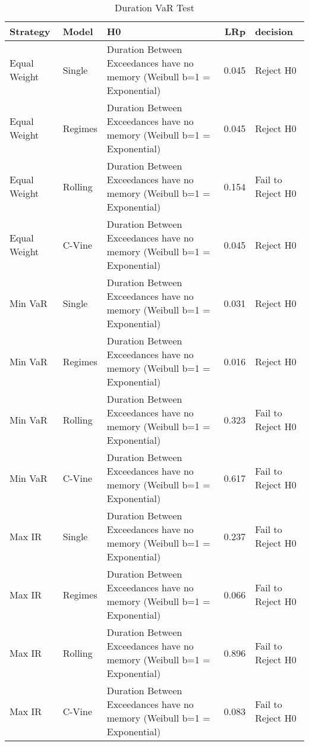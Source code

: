 \begin{table}

\caption{Duration VaR Test}
\centering
\begin{tabular}[t]{lllrl}
\toprule
Strategy & Model & H0 & LRp & decision\\
\midrule
Equal Weight & Single & Duration Between Exceedances have no memory (Weibull b=1 = Exponential) & 0.045 & Reject H0\\
Equal Weight & Regimes & Duration Between Exceedances have no memory (Weibull b=1 = Exponential) & 0.045 & Reject H0\\
Equal Weight & Rolling & Duration Between Exceedances have no memory (Weibull b=1 = Exponential) & 0.154 & Fail to Reject H0\\
Equal Weight & C-Vine & Duration Between Exceedances have no memory (Weibull b=1 = Exponential) & 0.045 & Reject H0\\
Min VaR & Single & Duration Between Exceedances have no memory (Weibull b=1 = Exponential) & 0.031 & Reject H0\\
\addlinespace
Min VaR & Regimes & Duration Between Exceedances have no memory (Weibull b=1 = Exponential) & 0.016 & Reject H0\\
Min VaR & Rolling & Duration Between Exceedances have no memory (Weibull b=1 = Exponential) & 0.323 & Fail to Reject H0\\
Min VaR & C-Vine & Duration Between Exceedances have no memory (Weibull b=1 = Exponential) & 0.617 & Fail to Reject H0\\
Max IR & Single & Duration Between Exceedances have no memory (Weibull b=1 = Exponential) & 0.237 & Fail to Reject H0\\
Max IR & Regimes & Duration Between Exceedances have no memory (Weibull b=1 = Exponential) & 0.066 & Fail to Reject H0\\
\addlinespace
Max IR & Rolling & Duration Between Exceedances have no memory (Weibull b=1 = Exponential) & 0.896 & Fail to Reject H0\\
Max IR & C-Vine & Duration Between Exceedances have no memory (Weibull b=1 = Exponential) & 0.083 & Fail to Reject H0\\
\bottomrule
\end{tabular}
\end{table}
